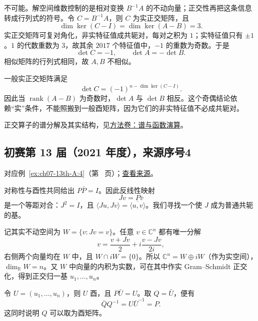 \documentclass[UTF8,12pt,a4paper,fontset=fandol]{ctexart}
\begin{document}
\begin{solve}

不可能。解空间维数控制的是相对变换 $B^{-1}A$ 的不动向量；正交性再把这条信息转成行列式的符号。令 $C=B^{-1}A$，则 $C$ 为实正交矩阵，且
\[
\dim\ker(C-I)=\dim\ker(A-B)=3.
\]
实正交矩阵可复对角化，非实特征值成共轭对，每对之积为 $1$；实特征值只有 $\pm1$。$1$ 的代数重数为 $3$，故其余 $2017$ 个特征值中，$-1$ 的重数为奇数。于是
\[
\det C=-1,\qquad \det A=-\det B.
\]
相似矩阵的行列式相同，故 $A,B$ 不相似。

\end{solve}

\begin{remark}[方法与条件]

一般实正交矩阵满足
\[
\det C=(-1)^{n-\dim\ker(C-I)}.
\]
因此当 $\operatorname{rank}(A-B)$ 为奇数时，$\det A$ 与 $\det B$ 相反。这个奇偶结论依赖“实”条件，不能照搬到一般酉矩阵，因为它们的非实特征值不必成共轭对。

正交算子的谱分解及其实结构，见\hyperref[app:linear-spectral]{方法卷：谱与函数演算}。

\end{remark}

\subsection{初赛第 13 届（2021 年度），来源序号4}\label{ans:ch07-13th-A:4}\label{pr:ch07-13th-A:4}

对应例~\ref{ex:ch07-13th-A:4}（第~\pageref{ex:ch07-13th-A:4} 页）；\href{https://github.com/lzxcr/cmc-mathematics/blob/64916fa1fdbc3e444a652eca204d5669058ee321/src/problems/preliminary/13/04.md}{查看来源}。

\begin{solve}

对称性与酉性共同给出 $P\bar P=I$。因此反线性映射
\[
Jv=P\bar v
\]
是一个等距对合：$J^2=I$，且 $\langle Ju,Jv\rangle=\overline{\langle u,v\rangle}$。我们寻找一个使 $J$ 成为普通共轭的基。

记其实不动空间为 $W=\{v:Jv=v\}$。任意 $v\in\mathbb C^n$ 都有唯一分解
\[
v=\frac{v+Jv}{2}+i\frac{v-Jv}{2i},
\]
右侧两个向量均在 $W$ 中，且 $W\cap iW=\{0\}$。所以 $\mathbb C^n=W\oplus iW$（作为实空间），$\dim_{\mathbb R}W=n$。又 $W$ 中向量的内积为实数，可在其中作实 Gram--Schmidt 正交化，得到正交归一基 $u_1,\ldots,u_n$。

令 $U=(u_1,\ldots,u_n)$，则 $U$ 酉，且 $P\bar U=U$。取 $Q=\bar U$，便有
\[
\bar Q Q^{-1}=U\bar U^{-1}=P.
\]
这同时说明 $Q$ 可以取为酉矩阵。

\end{solve}
\end{document}
